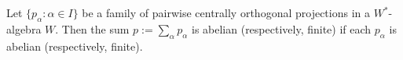 Let $\{p_\alpha : \alpha \in I\}$ be a family of pairwise centrally orthogonal projections in a $W^*$-algebra $W$. Then the sum $p := \sum_\alpha p_\alpha$ is abelian (respectively, finite) if each $p_\alpha$ is abelian (respectively, finite).
